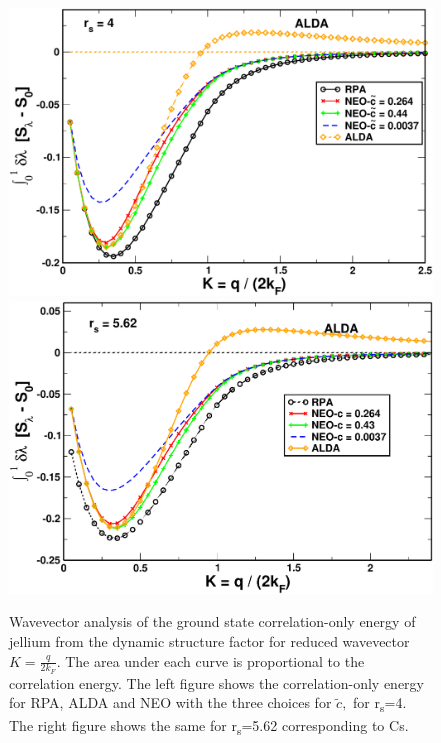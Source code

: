 \documentclass[aps,amsmath,amssymb, preprint, 12pt]{revtex4-1}
\begin{document}

\begin{figure}[h!]	
	
	\includegraphics[scale=0.3]{figure_12.pdf}
	\includegraphics[scale=0.3]{figure_13.pdf}
	\caption{Wavevector analysis of the ground state correlation-only energy of jellium from the dynamic structure factor for reduced wavevector  \( K=\frac{q}{2k_{F}}. \) The area under each curve is proportional to the correlation energy. The left figure shows the correlation-only energy for RPA, ALDA and NEO with the three choices for  \( \widetilde{c}, \)  for r\textsubscript{s}=4. The right figure shows the same for r\textsubscript{s}=5.62 corresponding to Cs.}
	\label{fig7}
\end{figure}


\end{document}
